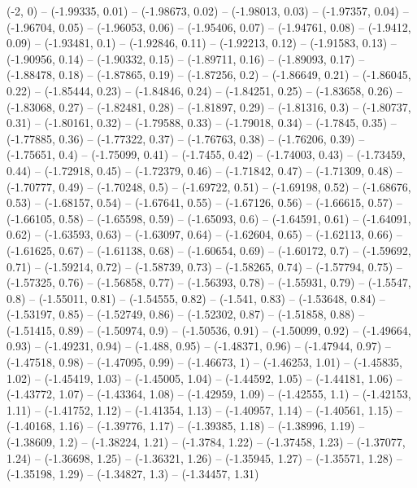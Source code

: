 \drawBand (-2, 0)
-- (-1.99335, 0.01)
-- (-1.98673, 0.02)
-- (-1.98013, 0.03)
-- (-1.97357, 0.04)
-- (-1.96704, 0.05)
-- (-1.96053, 0.06)
-- (-1.95406, 0.07)
-- (-1.94761, 0.08)
-- (-1.9412, 0.09)
-- (-1.93481, 0.1)
-- (-1.92846, 0.11)
-- (-1.92213, 0.12)
-- (-1.91583, 0.13)
-- (-1.90956, 0.14)
-- (-1.90332, 0.15)
-- (-1.89711, 0.16)
-- (-1.89093, 0.17)
-- (-1.88478, 0.18)
-- (-1.87865, 0.19)
-- (-1.87256, 0.2)
-- (-1.86649, 0.21)
-- (-1.86045, 0.22)
-- (-1.85444, 0.23)
-- (-1.84846, 0.24)
-- (-1.84251, 0.25)
-- (-1.83658, 0.26)
-- (-1.83068, 0.27)
-- (-1.82481, 0.28)
-- (-1.81897, 0.29)
-- (-1.81316, 0.3)
-- (-1.80737, 0.31)
-- (-1.80161, 0.32)
-- (-1.79588, 0.33)
-- (-1.79018, 0.34)
-- (-1.7845, 0.35)
-- (-1.77885, 0.36)
-- (-1.77322, 0.37)
-- (-1.76763, 0.38)
-- (-1.76206, 0.39)
-- (-1.75651, 0.4)
-- (-1.75099, 0.41)
-- (-1.7455, 0.42)
-- (-1.74003, 0.43)
-- (-1.73459, 0.44)
-- (-1.72918, 0.45)
-- (-1.72379, 0.46)
-- (-1.71842, 0.47)
-- (-1.71309, 0.48)
-- (-1.70777, 0.49)
-- (-1.70248, 0.5)
-- (-1.69722, 0.51)
-- (-1.69198, 0.52)
-- (-1.68676, 0.53)
-- (-1.68157, 0.54)
-- (-1.67641, 0.55)
-- (-1.67126, 0.56)
-- (-1.66615, 0.57)
-- (-1.66105, 0.58)
-- (-1.65598, 0.59)
-- (-1.65093, 0.6)
-- (-1.64591, 0.61)
-- (-1.64091, 0.62)
-- (-1.63593, 0.63)
-- (-1.63097, 0.64)
-- (-1.62604, 0.65)
-- (-1.62113, 0.66)
-- (-1.61625, 0.67)
-- (-1.61138, 0.68)
-- (-1.60654, 0.69)
-- (-1.60172, 0.7)
-- (-1.59692, 0.71)
-- (-1.59214, 0.72)
-- (-1.58739, 0.73)
-- (-1.58265, 0.74)
-- (-1.57794, 0.75)
-- (-1.57325, 0.76)
-- (-1.56858, 0.77)
-- (-1.56393, 0.78)
-- (-1.55931, 0.79)
-- (-1.5547, 0.8)
-- (-1.55011, 0.81)
-- (-1.54555, 0.82)
-- (-1.541, 0.83)
-- (-1.53648, 0.84)
-- (-1.53197, 0.85)
-- (-1.52749, 0.86)
-- (-1.52302, 0.87)
-- (-1.51858, 0.88)
-- (-1.51415, 0.89)
-- (-1.50974, 0.9)
-- (-1.50536, 0.91)
-- (-1.50099, 0.92)
-- (-1.49664, 0.93)
-- (-1.49231, 0.94)
-- (-1.488, 0.95)
-- (-1.48371, 0.96)
-- (-1.47944, 0.97)
-- (-1.47518, 0.98)
-- (-1.47095, 0.99)
-- (-1.46673, 1)
-- (-1.46253, 1.01)
-- (-1.45835, 1.02)
-- (-1.45419, 1.03)
-- (-1.45005, 1.04)
-- (-1.44592, 1.05)
-- (-1.44181, 1.06)
-- (-1.43772, 1.07)
-- (-1.43364, 1.08)
-- (-1.42959, 1.09)
-- (-1.42555, 1.1)
-- (-1.42153, 1.11)
-- (-1.41752, 1.12)
-- (-1.41354, 1.13)
-- (-1.40957, 1.14)
-- (-1.40561, 1.15)
-- (-1.40168, 1.16)
-- (-1.39776, 1.17)
-- (-1.39385, 1.18)
-- (-1.38996, 1.19)
-- (-1.38609, 1.2)
-- (-1.38224, 1.21)
-- (-1.3784, 1.22)
-- (-1.37458, 1.23)
-- (-1.37077, 1.24)
-- (-1.36698, 1.25)
-- (-1.36321, 1.26)
-- (-1.35945, 1.27)
-- (-1.35571, 1.28)
-- (-1.35198, 1.29)
-- (-1.34827, 1.3)
-- (-1.34457, 1.31)
